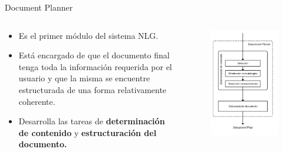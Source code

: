 \documentclass[pdf]{beamer}
\begin{document}
\begin{frame}{Document Planner}{}
  \begin{columns}[T] %
  \begin{column}{.60\textwidth}

  \begin{itemize}
    \item Es el primer módulo del sistema NLG.
    \item Está encargado de que el documento final tenga toda la información requerida por el usuario y que la misma se encuentre estructurada de una forma relativamente coherente.
    \item Desarrolla las tareas de \textbf{determinación de contenido} y \textbf{estructuración del documento.}
  \end{itemize}  
  
  \end{column}%
  \hfill%
  \begin{column}{.40\textwidth}
  \begin{figure}[H]
    \centering
    \includegraphics[scale=0.17]{img/tareas_document_planner.png}
  \end{figure}
  \end{column}%
  \end{columns}
  

\end{frame}
\end{document}
